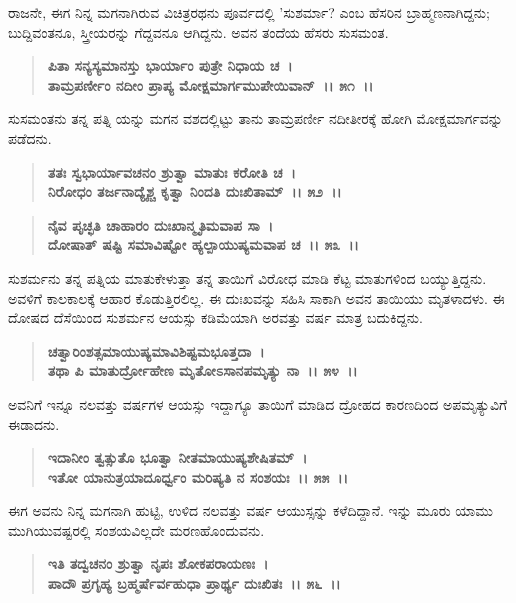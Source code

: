 ರಾಜನೇ, ಈಗ ನಿನ್ನ ಮಗನಾಗಿರುವ ವಿಚಿತ್ರರಥನು ಪೂರ್ವದಲ್ಲಿ 'ಸುಶರ್ಮಾ? ಎಂಬ ಹೆಸರಿನ ಬ್ರಾಹ್ಮಣನಾಗಿದ್ದನು; ಬುದ್ದಿವಂತನೂ, ಸ್ತ್ರೀಯರನ್ನು ಗೆದ್ದವನೂ ಆಗಿದ್ದನು. ಅವನ ತಂದೆಯ ಹೆಸರು ಸುಸಮಂತ.

\begin{verse}
\textbf{ಪಿತಾ ಸನ್ಯಸ್ಯಮಾನಸ್ತು ಭಾರ್ಯಾಂ ಪುತ್ರೇ ನಿಧಾಯ ಚ~।}\\\textbf{ತಾಮ್ರಪರ್ಣೀಂ ನದೀಂ ಪ್ರಾಪ್ಯ ಮೋಕ್ಷಮಾರ್ಗಮುಪೇಯಿವಾನ್~।। ೫೧~।।}
\end{verse}

ಸುಸಮಂತನು ತನ್ನ ಪತ್ನಿ ಯನ್ನು ಮಗನ ವಶದಲ್ಲಿಟ್ಟು ತಾನು ತಾಮ್ರಪರ್ಣೀ ನದೀತೀರಕ್ಕೆ ಹೋಗಿ ಮೋಕ್ಷಮಾರ್ಗವನ್ನು ಪಡೆದನು.

\begin{verse}
\textbf{ತತಃ ಸ್ವಭಾರ್ಯಾವಚನಂ ಶ್ರುತ್ವಾ ಮಾತುಃ ಕರೋತಿ ಚ~।}\\\textbf{ನಿರೋಧಂ ತರ್ಜನಾದ್ಯೈಶ್ಚ ಕೃತ್ವಾ ನಿಂದತಿ ದುಃಖಿತಾಮ್~।। ೫೨~।। }
\end{verse}

\begin{verse}
\textbf{ನೈವ ಪೃಚ್ಛತಿ ಚಾಹಾರಂ ದುಃಖಾನ್ಮೃತಿಮವಾಪ ಸಾ~।}\\\textbf{ದೋಷಾತ್ ಷಷ್ಟಿ ಸಮಾವಿಷ್ಟೋ ಹ್ಯಲ್ಪಾಯುಷ್ಯಮವಾಪ ಚ~।। ೫೩~।।}
\end{verse}

ಸುಶರ್ಮನು ತನ್ನ ಪತ್ನಿಯ ಮಾತುಕೇಳುತ್ತಾ ತನ್ನ ತಾಯಿಗೆ ವಿರೋಧ ಮಾಡಿ ಕೆಟ್ಟ ಮಾತುಗಳಿಂದ ಬಯ್ಯುತ್ತಿದ್ದನು. ಅವಳಿಗೆ ಕಾಲಕಾಲಕ್ಕೆ ಆಹಾರ ಕೊಡುತ್ತಿರಲಿಲ್ಲ. ಈ ದುಃಖವನ್ನು ಸಹಿಸಿ ಸಾಕಾಗಿ ಅವನ ತಾಯಿಯು ಮೃತಳಾದಳು. ಈ ದೋಷದ ದೆಸೆಯಿಂದ ಸುಶರ್ಮನ ಆಯಸ್ಸು ಕಡಿಮೆಯಾಗಿ ಅರವತ್ತು ವರ್ಷ ಮಾತ್ರ ಬದುಕಿದ್ದನು.

\begin{verse}
\textbf{ಚತ್ವಾರಿಂಶತ್ಸಮಾಯುಷ್ಯಮಾವಿಶಿಷ್ಟಮಭೂತ್ತದಾ~।}\\\textbf{ತಥಾ ಪಿ ಮಾತುರ್ದ್ರೋಹೇಣ ಮೃತೋಽಸಾನಪಮೃತ್ಯು ನಾ~।। ೫೪~।।}
\end{verse}

ಅವನಿಗೆ ಇನ್ನೂ ನಲವತ್ತು ವರ್ಷಗಳ ಆಯಸ್ಸು ಇದ್ದಾಗ್ಯೂ ತಾಯಿಗೆ ಮಾಡಿದ ದ್ರೋಹದ ಕಾರಣದಿಂದ ಅಪಮೃತ್ಯುವಿಗೆ ಈಡಾದನು.

\begin{verse}
\textbf{ಇದಾನೀಂ ತ್ವತ್ಸುತೊ ಭೂತ್ವಾ ನೀತಮಾಯುಷ್ಯಶೇಷಿತಮ್~।}\\\textbf{ಇತೋ ಯಾನುತ್ರಯಾದೂರ್ಧ್ವಂ ಮರಿಷ್ಯತಿ ನ ಸಂಶಯಃ~।। ೫೫~।।}
\end{verse}

ಈಗ ಅವನು ನಿನ್ನ ಮಗನಾಗಿ ಹುಟ್ಟಿ, ಉಳಿದ ನಲವತ್ತು ವರ್ಷ ಆಯುಸ್ಸನ್ನು ಕಳೆದಿದ್ದಾನೆ. ಇನ್ನು ಮೂರು ಯಾಮು ಮುಗಿಯುವಷ್ಟರಲ್ಲಿ ಸಂಶಯವಿಲ್ಲದೇ ಮರಣಹೊಂದುವನು.

\begin{verse}
\textbf{ಇತಿ ತದ್ವಚನಂ ಶ್ರುತ್ವಾ ನೃಪಃ ಶೋಕಪರಾಯಣಃ~।}\\\textbf{ಪಾದೌ ಪ್ರಗೃಹ್ಯ ಬ್ರಹ್ಮರ್ಷೆರ್ವಹುಧಾ ಪ್ರಾರ್ಥ್ಯ ದುಃಖಿತಃ~।। ೫೬~।। }
\end{verse}

